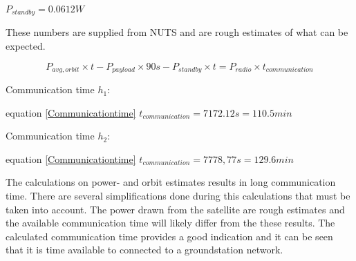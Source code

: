 $P_{standby} = 0.0612W$ 

These numbers are supplied from NUTS and are rough estimates of what can be expected.

\begin{equation} P_{avg,orbit}\times t - P_{payload}\times 90 s - P_{standby}\times t= P_{radio}\times t_{communication}
\label{Communicationtime}
\end{equation}

Communication time $h_1$:

equation \ref{Communicationtime}
$t_{communication} = 7172.12s =110.5 min$

Communication time $h_2$:

equation \ref{Communicationtime}
$t_{communication} = 7778,77s =129.6min$

The calculations on power- and orbit estimates results in long communication time. There are several simplifications done during this calculations that must be taken into account. The power drawn from the satellite are rough estimates and the available communication time will likely differ from the these results. The calculated communication time provides a good indication and it can be seen that it is time available to connected to a groundstation network.




















